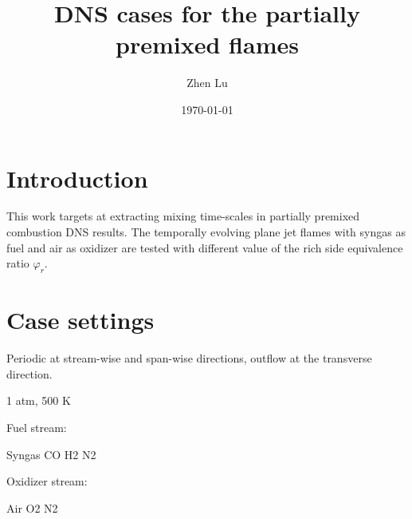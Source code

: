 \documentclass[11pt]{article}
\title{DNS cases for the partially premixed flames}
\date{\today}
\author{Zhen Lu}
\begin{document}
\section{Introduction}

This work targets at extracting mixing time-scales in partially premixed combustion DNS results. The temporally evolving plane jet flames with syngas as fuel and air as oxidizer are tested with different value of the rich side equivalence ratio $\varphi_r$.

\section{Case settings}

Periodic at stream-wise and span-wise directions, outflow at the transverse direction.

1 atm, 500 K

Fuel stream:

Syngas CO H2 N2

Oxidizer stream:

Air O2 N2
\end{document}
